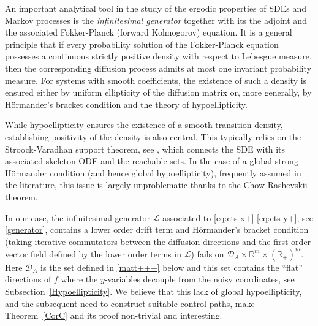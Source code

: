 \documentclass[11pt, a4paper,leqno]{amsart}
\theoremstyle{definition}
\numberwithin{equation}{section}
\begin{document}
An important analytical tool in the study of the ergodic properties of SDEs and Markov processes
is the \emph{infinitesimal generator}
together with its the adjoint and the associated
Fokker-Planck (forward Kolmogorov) equation. It is a general principle that if every probability solution of the
Fokker-Planck equation possesses a continuous strictly positive density
with respect to Lebesgue measure, then the corresponding diffusion process
admits at most one invariant probability measure.
For systems with smooth coefficients, the existence of such a density is ensured
either by uniform ellipticity of the diffusion matrix or,
more generally, by Hörmander's bracket condition and the theory of hypoellipticity.










While hypoellipticity ensures the existence of a smooth transition
density,  establishing positivity of
the density is also central. This typically relies on the Stroock-Varadhan support
theorem, see \cite{StroockVaradhan1972,StroockVaradhan1979}, which connects the SDE with its associated skeleton ODE and the reachable sets. In the case of a global strong Hörmander condition (and hence global hypoellipticity),
frequently assumed in the literature, this issue is largely unproblematic
thanks to the Chow-Rashevskii theorem.


In our case, the {infinitesimal generator} ${\mathcal L}$ associated to \eqref{eq:cts-x+}-\eqref{eq:cts-y+}, see
\eqref{generator}, contains a  lower order drift term and Hörmander's bracket condition (taking iterative commutators between the diffusion directions and the first order vector field defined by the lower order terms in ${\mathcal L}$) fails
on $\mathcal D_A\times\mathbb R^m\times(\mathbb R_+)^m$. Here  $\mathcal D_A$ is the set defined in \eqref{matt+++} below and this set contains the ``flat'' directions of $f$ where the $y$-variables decouple from
the noisy coordinates, see Subsection~\ref{Hypoellipticity}. We believe that this lack of global hypoellipticity,  and the subsequent need to construct suitable
control paths,  make Theorem~\ref{CorC} and its proof non-trivial and interesting.
\end{document}
